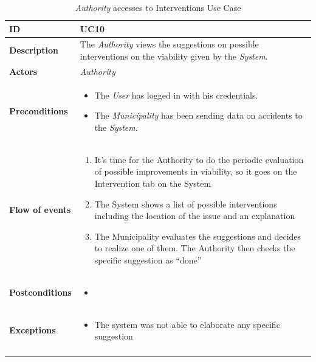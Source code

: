 \documentclass {article}
\begin{document}
	\begin{longtable}{| p{3 cm} | p{10.5cm} |} 
			\hline
			{\bf ID} & UC10 \\
			\hline
			{\bf Description} & The {\it Authority} views the suggestions on possible interventions on the viability given by the {\it System}. \\
			\hline
			{\bf Actors} & {\it Authority}\\
			\hline
			{\bf Preconditions} & \begin{itemize}
								  \item The {\it User} has logged in with his credentials.
								  \item The {\it Municipality} has been sending data on accidents to the {\it System}.
								  \end{itemize}	\\
			\hline
			{\bf Flow of events} &	\begin{enumerate}
								  \item It’s time for the Authority to do the periodic evaluation of possible improvements in viability, so it goes on the Intervention tab on the System
								  \item The System shows a list of possible interventions including the location of the issue and an explanation
								  \item The Municipality evaluates the suggestions and decides to realize one of them. The Authority then checks the specific suggestion as “done”
								  \end{enumerate}	\\
			\hline
			{\bf Postconditions} & \begin{itemize}
								  \item
								  \end{itemize}	 \\
			\hline
			{\bf Exceptions} & 	\begin{itemize}
								  \item The system was not able to elaborate any specific suggestion
								  \end{itemize}	\\
			\hline
			\caption{{\it Authority} accesses to Interventions Use Case}
			\end{longtable} 

	\pagebreak
\end{document}
